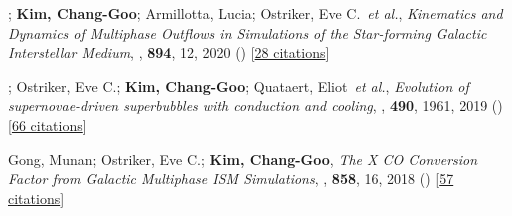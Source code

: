 \item[{15.}]; \textbf{Kim, Chang-Goo}; Armillotta, Lucia; Ostriker, Eve C.~\textit{et al.}, \textit{Kinematics and Dynamics of Multiphase Outflows in Simulations of the Star-forming Galactic Interstellar Medium}, , \textbf{894}, 12, 2020 () [\href{http://adsabs.harvard.edu/abs/2020ApJ...894...12V}{28 citations}]

\item[{14.}]; Ostriker, Eve C.; \textbf{Kim, Chang-Goo}; Quataert, Eliot~\textit{et al.}, \textit{Evolution of supernovae-driven superbubbles with conduction and cooling}, , \textbf{490}, 1961, 2019 () [\href{http://adsabs.harvard.edu/abs/2019MNRAS.490.1961E}{66 citations}]

\item[{13.}]Gong, Munan; Ostriker, Eve C.; \textbf{Kim, Chang-Goo}, \textit{The X CO Conversion Factor from Galactic Multiphase ISM Simulations}, , \textbf{858}, 16, 2018 () [\href{http://adsabs.harvard.edu/abs/2018ApJ...858...16G}{57 citations}]
